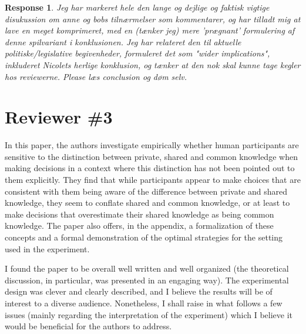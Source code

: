 \documentclass[a4paper]{article}
\newtheorem{response}{Response}
\newenvironment{robin}{\smallskip \noindent \color{red!10!green!50!blue}}{\color{black}\smallskip}
\newenvironment{tobo}{\smallskip \noindent \color{yellow!80!black!80}}{\color{black}\smallskip}
\begin{document}
\begin{response}

\begin{robin}
Jeg har markeret hele den lange og dejlige og faktisk vigtige disukussion om anne og bobs tilnærmelser som kommentarer, og har tilladt mig at lave en meget komprimeret, med en (tænker jeg) mere 'prægnant' formulering af denne spilvariant i konklusionen. Jeg har relateret den til aktuelle politiske/legislative begivenheder, formuleret det som "wider implications", inkluderet Nicolets herlige konklusion, og tænker at den nok skal kunne tage kegler hos reviewerne. Please læs conclusion og døm selv. 
\end{robin}


\end{response}


\section{Reviewer \#3}
 In this paper, the authors investigate empirically whether human participants are sensitive to the distinction between private, shared and common knowledge when making decisions in a context where this distinction has not been pointed out to them explicitly. They find that while participants appear to make choices that are consistent with them being aware of the difference between private and shared knowledge, they seem to conflate shared and common knowledge, or at least to make decisions that overestimate their shared knowledge as being common knowledge. The paper also offers, in the appendix, a formalization of these concepts and a formal demonstration of the optimal strategies for the setting used in the experiment.

I found the paper to be overall well written and well organized (the theoretical discussion, in particular, was presented in an engaging way). The experimental design was clever and clearly described, and I believe the results will be of interest to a diverse audience. Nonetheless, I shall raise in what follows a few issues (mainly regarding the interpretation of the experiment) which I believe it would be beneficial for the authors to address.
\end{document}
